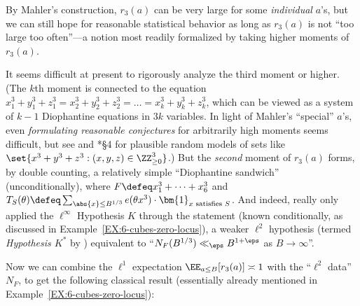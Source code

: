 \documentclass[12pt]{report}
\begin{document}

By Mahler's construction,
$r_3(a)$ can be very large for some \emph{individual} $a$'s,
but we can still hope for reasonable statistical behavior as long as $r_3(a)$ is
not ``too large too often''---a notion most readily formalized by taking higher moments of $r_3(a)$.

It seems difficult at present to rigorously analyze the third moment or higher.
(The $k$th moment is connected to the equation $x_1^3+y_1^3+z_1^3 = x_2^3+y_2^3+z_2^3 = \dots = x_k^3+y_k^3+z_k^3$, which can be viewed as a system of $k-1$ Diophantine equations in $3k$ variables.
In light of Mahler's ``special'' $a$'s,
even \emph{formulating reasonable conjectures} for arbitrarily high moments seems difficult,
but see \cite{deshouillers2006density} and \cite{diaconu2019admissible}*{\S4} for plausible random models of sets like $\set{x^3+y^3+z^3: (x,y,z)\in \ZZ_{\geq 0}^3}$.)
But the \emph{second} moment of $r_3(a)$ forms,
by double counting,
a relatively simple ``Diophantine sandwich''
(unconditionally),
where $F\defeq x_1^3+\dots+x_6^3$ and $T_S(\theta)\defeq\sum_{\abs{x}\leq B^{1/3}}e(\theta x^3)\cdot\bm{1}_\textnormal{$x$ satisfies $S$}$.
And indeed, \cite{hardy1925some} really only applied the $\ell^\infty$ Hypothesis $K$ through
the statement
(known conditionally, as discussed in Example~\ref{EX:6-cubes-zero-locus}),
a weaker $\ell^2$ hypothesis (termed \emph{Hypothesis $K^\ast$} by \cite{hooley_greaves_harman_huxley_1997}) equivalent to ``$N_F(B^{1/3})\ll_\eps B^{1+\eps}$ as $B\to\infty$''.

Now we can combine the $\ell^1$ expectation $\EE_{a\leq B}[r_3(a)]\asymp 1$
with the ``$\ell^2$ data'' $N_F$,
to get the following classical result (essentially already mentioned in Example~\ref{EX:6-cubes-zero-locus}):
\end{document}
